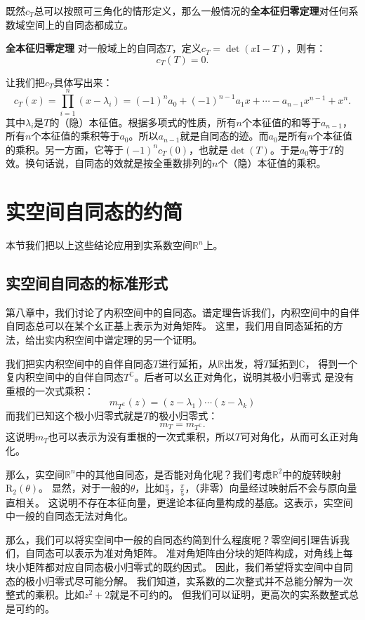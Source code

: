 \documentclass[12pt,UTF8,fontset=none]{ctexbook}
\begin{document}
既然$c_T$总可以按照可三角化的情形定义，那么一般情况的\textbf{全本征归零定理}对任何系数域空间上的自同态都成立。
\begin{tm}{\textbf{全本征归零定理}}
    对一般域上的自同态$T$，定义$c_T = \det(x\mathrm{I} - T)$，则有：
    $$ c_T(T) = 0.$$
\end{tm}

让我们把$c_T$具体写出来：
$$c_T(x) = \prod_{i=1}^n (x - \lambda_i) = (-1)^n a_0 + (-1)^{n-1} a_1 x + \cdots - a_{n-1}x^{n-1} + x^n.$$
其中$\lambda_i$是$T$的（隐）本征值。根据多项式的性质，所有$n$个本征值的和等于$a_{n-1}$，所有$n$个本征值的乘积等于$a_0$。所以$a_{n-1}$就是自同态的迹。而$a_0$是所有$n$个本征值的乘积。另一方面，它等于$(-1)^nc_T(0)$，也就是$\det(T)$。于是$a_0$等于$T$的效。换句话说，自同态的效就是按全重数排列的$n$个（隐）本征值的乘积。

\section{实空间自同态的约简}
本节我们把以上这些结论应用到实系数空间$\mathbb{R}^n$上。

\subsection{实空间自同态的标准形式}
第八章中，我们讨论了内积空间中的自同态。谱定理告诉我们，内积空间中的自伴自同态总可以在某个幺正基上表示为对角矩阵。
这里，我们用自同态延拓的方法，给出实内积空间中谱定理的另一个证明。

我们把实内积空间中的自伴自同态$T$进行延拓，从$\mathbb{R}$出发，将$T$延拓到$\mathbb{C}$，
得到一个复内积空间中的自伴自同态$T^{\mathbb{C}}$。后者可以幺正对角化，说明其极小归零式
是没有重根的一次式乘积：
$$m_{T^{\mathbb{C}}}(z) = (z -\lambda_1)\cdots(z - \lambda_k)$$
而我们已知这个极小归零式就是$T$的极小归零式：
$$m_T = m_{T^{\mathbb{C}}}.$$
这说明$m_T$也可以表示为没有重根的一次式乘积，所以$T$可对角化，从而可幺正对角化。

那么，实空间$\mathbb{R}^n$中的其他自同态，是否能对角化呢？我们考虑$\mathbb{R}^2$中的旋转映射$\mathrm{R}_2(\theta)$。
显然，对于一般的$\theta$，比如$\frac{\pi}{3}$，$\frac{\pi}{5}$，（非零）向量经过映射后不会与原向量直相关。
这说明不存在本征向量，更遑论本征向量构成的基底。这表示，实空间中一般的自同态无法对角化。

那么，我们可以将实空间中一般的自同态约简到什么程度呢？零空间引理告诉我们，自同态可以表示为准对角矩阵。
准对角矩阵由分块的矩阵构成，对角线上每块小矩阵都对应自同态极小归零式的既约因式。
因此，我们希望将实空间中自同态的极小归零式尽可能分解。
我们知道，实系数的二次整式并不总能分解为一次整式的乘积。比如$z^2+2$就是不可约的。
但我们可以证明，更高次的实系数整式总是可约的。
\end{document}
